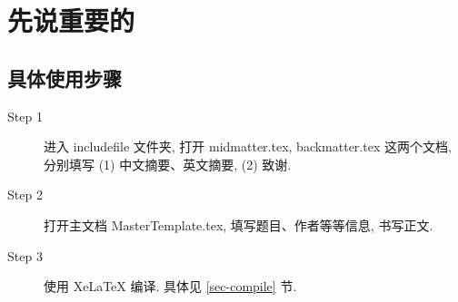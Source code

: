 \documentclass[forlib]{HDUMaster}   %
\begin{document}



\maketitle
\frontmatter
{}               %

\cleardoublepage
\newpage  \pagestyle{fancy} \fancyfancy

\tableofcontents

\mainmatter %
\baselineskip=20pt  %
\chapter{先说重要的}

\section{具体使用步骤}
\begin{description}

  \item[Step 1]  进入 includefile 文件夹,  打开 midmatter.tex,  backmatter.tex 这两个文档,
        分别填写 (1) 中文摘要、英文摘要, (2) 致谢.

  \item[Step 2]  打开主文档 MasterTemplate.tex, 填写题目、作者等等信息, 书写正文.

  \item[Step 3]  使用 XeLaTeX 编译. 具体见 \ref{sec-compile} 节.


\end{description}
\end{document}
